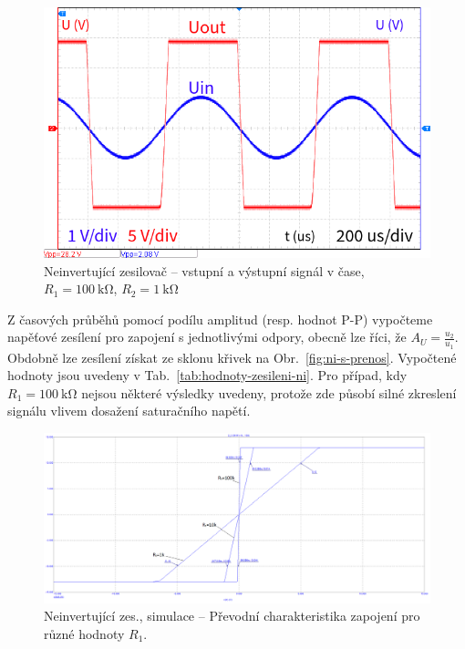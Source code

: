 \documentclass{protokol}
\begin{document}
\begin{figure}[h!]
	\centering
	\includegraphics[width=\textwidth]{oscilo/output7.png}
	\centering
	\caption{Neinvertující zesilovač -- vstupní a výstupní signál v čase, $R_1=\SI{100}{\kilo\ohm}$, $R_2=\SI{1}{\kilo\ohm}$}
	\label{fig:ni-l-prenos-100k}
\end{figure}

Z časových průběhů pomocí podílu amplitud (resp. hodnot P-P) vypočteme napěťové zesílení pro zapojení s jednotlivými odpory, obecně lze říci, že $ A_U=\frac{u_2}{u_1} $. Obdobně lze zesílení získat ze sklonu křivek na Obr.~\ref{fig:ni-s-prenos}. Vypočtené hodnoty jsou uvedeny v Tab.~\ref{tab:hodnoty-zesileni-ni}. Pro případ, kdy $ R_1=\qty{100}{\kilo\ohm}$ nejsou některé výsledky uvedeny, protože zde působí silné zkreslení signálu vlivem dosažení saturačního napětí.



\begin{figure}[h!]
	\centering
	\includegraphics[width=\textwidth]{numerika/NonInverting/4_dc_zesileni.png}
	\centering
	\caption{Neinvertující zes., simulace -- Převodní charakteristika zapojení pro různé hodnoty $ R_1 $.}
	\label{fig:ni-s-prevodni}
\end{figure}
\end{document}
